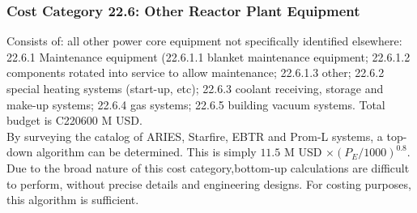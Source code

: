 
\subsubsection{Cost Category 22.6: Other Reactor Plant Equipment}
Consists of: all other power core equipment not specifically identified elsewhere: 22.6.1 Maintenance equipment (22.6.1.1 blanket maintenance equipment; 22.6.1.2 components rotated into service to
allow maintenance; 22.6.1.3 other; 22.6.2 special heating systems (start-up, etc); 22.6.3 coolant receiving, storage and make-up systems; 22.6.4 gas systems; 22.6.5 building vacuum systems.  Total budget is C220600 M USD.\\

By surveying the catalog of ARIES, Starfire, EBTR and Prom-L systems, a top-down algorithm can be determined. This is simply $11.5$ M USD $\times (P_E/1000)^{0.8}$. Due to the broad nature of this cost category,bottom-up calculations are difficult to perform, without precise details and engineering designs. For costing purposes, this algorithm is sufficient.